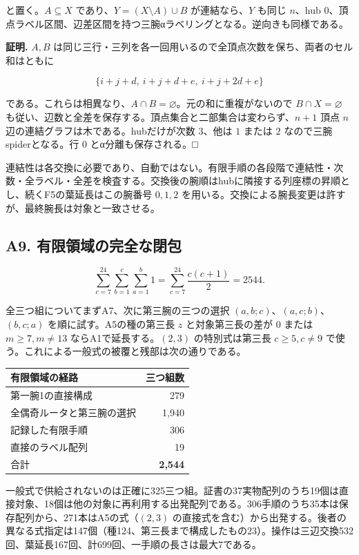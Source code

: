 \documentclass[
  10pt,
  a4paper,
]{article}
\begin{document}
と置く。\(A\subseteq X\) であり、\(Y=(X\setminus A)\cup B\)
が連結なら、\(Y\) も同じ \(n\)、hub
\(0\)、頂点ラベル区間、辺差区間を持つ三腕αラベリングとなる。逆向きも同様である。

\textbf{証明.} \(A,B\)
は同じ三行・三列を各一回用いるので全頂点次数を保ち、両者のセル和はともに

\[
\{i+j+d,\ i+j+d+e,\ i+j+2d+e\}
\]

である。これらは相異なり、\(A\cap B=\varnothing\)。元の和に重複がないので
\(B\cap X=\varnothing\)
も従い、辺数と全差を保存する。頂点集合と二部集合は変わらず、\(n+1\) 頂点
\(n\) 辺の連結グラフは木である。hubだけが次数 \(3\)、他は \(1\) または
\(2\) なので三腕spiderとなる。行 \(0\) とα分離も保存される。□

連結性は各交換に必要であり、自動ではない。有限手順の各段階で連結性・次数・全ラベル・全差を検査する。交換後の腕順はhubに隣接する列座標の昇順とし、続くF5の葉延長はこの腕番号
\(0,1,2\)
を用いる。交換による腕長変更は許すが、最終腕長は対象と一致させる。

\subsection{A9.
有限領域の完全な閉包}\label{a9.-ux6709ux9650ux9818ux57dfux306eux5b8cux5168ux306aux9589ux5305}

\[
\sum_{c=7}^{24}\sum_{b=1}^{c}\sum_{a=1}^{b}1
=\sum_{c=7}^{24}\frac{c(c+1)}2=2544.
\]

全三つ組についてまずA7、次に第三腕の三つの選択
\((a,b;c)\)、\((a,c;b)\)、\((b,c;a)\) を順に試す。A5の種の第三長 \(z\)
と対象第三長の差が \(0\) または \(m\ge7,m\ne13\)
ならA1で延長する。\((2,3)\) の特別式は第三長 \(c\ge5,c\ne9\)
で使う。これによる一般式の被覆と残部は次の通りである。

\begin{longtable}[]{@{}lr@{}}
\toprule\noalign{}
有限領域の経路 & 三つ組数 \\
\midrule\noalign{}
\endhead
\bottomrule\noalign{}
\endlastfoot
第一腕1の直接構成 & 279 \\
全偶奇ルータと第三腕の選択 & 1,940 \\
記録した有限手順 & 306 \\
直接のラベル配列 & 19 \\
合計 & \textbf{2,544} \\
\end{longtable}

一般式で供給されないのは正確に325三つ組。証書の37実物配列のうち19個は直接対象、18個は他の対象に再利用する出発配列である。306手順のうち35本は保存配列から、271本はA5の式（\((2,3)\)
の直接式を含む）から出発する。後者の異なる式指定は147個（種124、第三長まで構成したもの23）。操作は三辺交換532回、葉延長167回、計699回、一手順の長さは最大7である。
\end{document}
